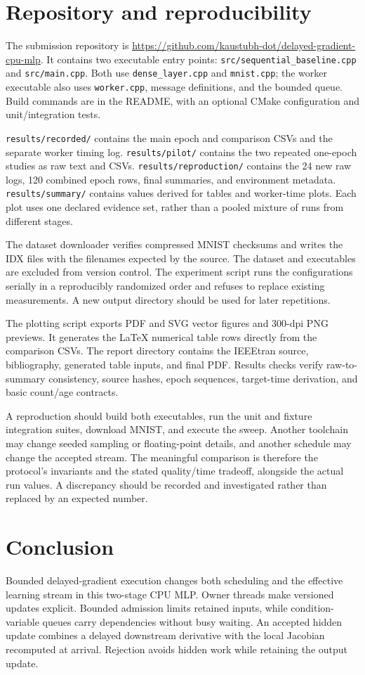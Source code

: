 \documentclass[conference]{IEEEtran}
\newcommand{\repo}{\url{https://github.com/kaustubh-dot/delayed-gradient-cpu-mlp}}
\begin{document}
\section{Repository and reproducibility}
The submission repository is \repo. It contains two executable entry points: \texttt{src/sequential\_baseline.cpp} and \texttt{src/main.cpp}. Both use \texttt{dense\_layer.cpp} and \texttt{mnist.cpp}; the worker executable also uses \texttt{worker.cpp}, message definitions, and the bounded queue. Build commands are in the README, with an optional CMake configuration and unit/integration tests.

\texttt{results/recorded/} contains the main epoch and comparison CSVs and the separate worker timing log. \texttt{results/pilot/} contains the two repeated one-epoch studies as raw text and CSVs. \texttt{results/reproduction/} contains the 24 new raw logs, 120 combined epoch rows, final summaries, and environment metadata. \texttt{results/summary/} contains values derived for tables and worker-time plots. Each plot uses one declared evidence set, rather than a pooled mixture of runs from different stages.

The dataset downloader verifies compressed MNIST checksums and writes the IDX files with the filenames expected by the source. The dataset and executables are excluded from version control. The experiment script runs the configurations serially in a reproducibly randomized order and refuses to replace existing measurements. A new output directory should be used for later repetitions.

The plotting script exports PDF and SVG vector figures and 300-dpi PNG previews. It generates the LaTeX numerical table rows directly from the comparison CSVs. The report directory contains the IEEEtran source, bibliography, generated table inputs, and final PDF. Results checks verify raw-to-summary consistency, source hashes, epoch sequences, target-time derivation, and basic count/age contracts.

A reproduction should build both executables, run the unit and fixture integration suites, download MNIST, and execute the sweep. Another toolchain may change seeded sampling or floating-point details, and another schedule may change the accepted stream. The meaningful comparison is therefore the protocol's invariants and the stated quality/time tradeoff, alongside the actual run values. A discrepancy should be recorded and investigated rather than replaced by an expected number.

\section{Conclusion}
Bounded delayed-gradient execution changes both scheduling and the effective learning stream in this two-stage CPU MLP. Owner threads make versioned updates explicit. Bounded admission limits retained inputs, while condition-variable queues carry dependencies without busy waiting. An accepted hidden update combines a delayed downstream derivative with the local Jacobian recomputed at arrival. Rejection avoids hidden work while retaining the output update.
\end{document}
